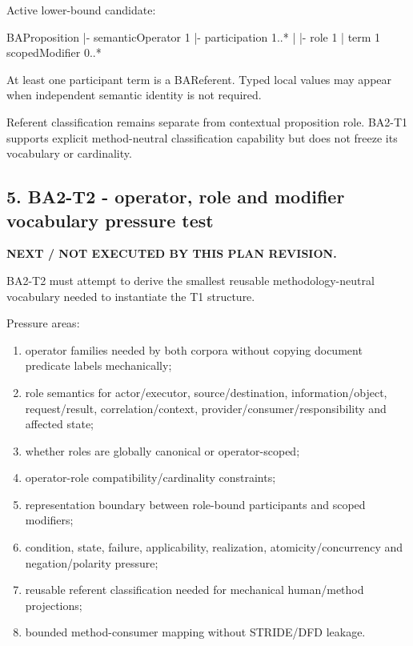 \documentclass[
  10pt,
  letterpaper,
]{article}
\newenvironment{Shaded}{}{}
\newcommand{\NormalTok}[1]{#1}
\providecommand{\tightlist}{%
  \setlength{\itemsep}{0pt}\setlength{\parskip}{0pt}}
\begin{document}
Active lower-bound candidate:

\begin{Shaded}
\begin{Highlighting}[]
\NormalTok{BAProposition}
\NormalTok{|{-} semanticOperator                  1}
\NormalTok{|{-} participation                     1..*}
\NormalTok{|    |{-} role                         1}
\NormalTok{|    \textasciigrave{}{-} term                         1}
\NormalTok{\textasciigrave{}{-} scopedModifier                    0..*}
\end{Highlighting}
\end{Shaded}

At least one participant term is a BAReferent. Typed local values may
appear when independent semantic identity is not required.

Referent classification remains separate from contextual proposition
role. BA2-T1 supports explicit method-neutral classification capability
but does not freeze its vocabulary or cardinality.

\subsection{5. BA2-T2 - operator, role and modifier vocabulary pressure
test}\label{ba2-t2---operator-role-and-modifier-vocabulary-pressure-test}

\textbf{NEXT / NOT EXECUTED BY THIS PLAN REVISION.}

BA2-T2 must attempt to derive the smallest reusable methodology-neutral
vocabulary needed to instantiate the T1 structure.

Pressure areas:

\begin{enumerate}
\def\labelenumi{\arabic{enumi}.}
\tightlist
\item
  operator families needed by both corpora without copying document
  predicate labels mechanically;
\item
  role semantics for actor/executor, source/destination,
  information/object, request/result, correlation/context,
  provider/consumer/responsibility and affected state;
\item
  whether roles are globally canonical or operator-scoped;
\item
  operator-role compatibility/cardinality constraints;
\item
  representation boundary between role-bound participants and scoped
  modifiers;
\item
  condition, state, failure, applicability, realization,
  atomicity/concurrency and negation/polarity pressure;
\item
  reusable referent classification needed for mechanical human/method
  projections;
\item
  bounded method-consumer mapping without STRIDE/DFD leakage.
\end{enumerate}
\end{document}
